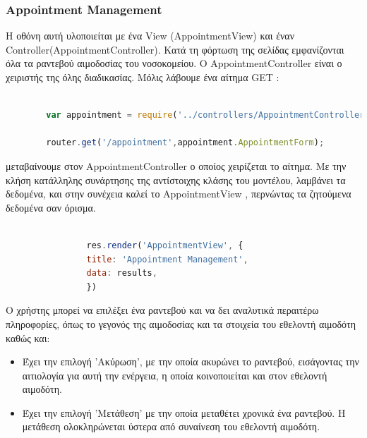 		
						\subsubsection{Appointment Management}
		
	Η οθόνη αυτή υλοποιείται με ένα View (AppointmentView) και έναν Controller(AppointmentController). Κατά τη φόρτωση της σελίδας εμφανίζονται όλα τα ραντεβού αιμοδοσίας του νοσοκομείου. O AppointmentController είναι ο χειριστής της όλης διαδικασίας. Μόλις λάβουμε ένα αίτημα GET :
		
		\begin{lstlisting}[language=Javascript]			
		
		var appointment = require('../controllers/AppointmentController');
		
		router.get('/appointment',appointment.AppointmentForm);  


		\end{lstlisting}
		
μεταβαίνουμε στον AppointmentController ο οποίος χειρίζεται το αίτημα. Με την κλήση κατάλληλης συνάρτησης της αντίστοιχης κλάσης του μοντέλου, λαμβάνει τα δεδομένα,  και στην συνέχεια καλεί το AppointmentView , περνώντας τα ζητούμενα δεδομένα σαν όρισμα.



		\begin{lstlisting}[language=Javascript]			
		
	            res.render('AppointmentView', { 
                title: 'Appointment Management',
                data: results,
				})

		\end{lstlisting}
		
		Ο χρήστης μπορεί να επιλέξει ένα ραντεβού και να δει αναλυτικά περαιτέρω πληροφορίες, όπως το γεγονός της αιμοδοσίας και  τα στοιχεία του εθελοντή αιμοδότη καθώς και:
		
		\begin{itemize}
		\item Έχει την επιλογή 'Ακύρωση', με την οποία ακυρώνει το ραντεβού, εισάγοντας την αιτιολογία για αυτή την ενέργεια, η οποία κοινοποιείται και στον εθελοντή αιμοδότη.
		
		\item Έχει την επιλογή 'Μετάθεση' με την οποία μεταθέτει χρονικά ένα ραντεβού. Η μετάθεση ολοκληρώνεται ύστερα από συναίνεση του εθελοντή αιμοδότη.		
		\end{itemize}

		

